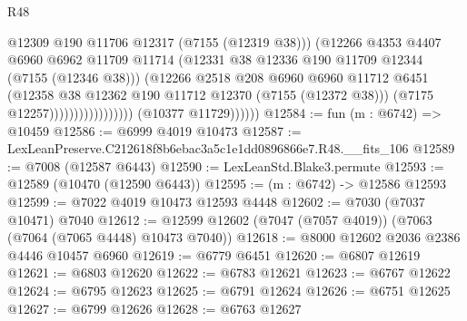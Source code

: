 \begin{lexlean}{R48}
\begin{coremodule}
                                            @12309
                                            @190
                                            @11706
                                            @12317
                                            (@7155 (@12319 @38)))
                                          (@12266
                                            @4353
                                            @4407
                                            @6960
                                            @6962
                                            @11709
                                            @11714
                                            (@12331
                                              @38
                                              @12336
                                              @190
                                              @11709
                                              @12344
                                              (@7155 (@12346 @38)))
                                            (@12266
                                              @2518
                                              @208
                                              @6960
                                              @6960
                                              @11712
                                              @6451
                                              (@12358
                                                @38
                                                @12362
                                                @190
                                                @11712
                                                @12370
                                                (@7155 (@12372 @38)))
                                              (@7175 @12257)))))))))))))))))
              (@10377 @11729))))))
@12584 := fun (m : @6742) => @10459
@12586 := @6999 @4019 @10473
@12587 := LexLeanPreserve.C212618f8b6ebac3a5c1e1dd0896866e7.R48.__fits_106
@12589 := @7008 (@12587 @6443)
@12590 := LexLeanStd.Blake3.permute
@12593 := @12589 (@10470 (@12590 @6443))
@12595 := (m : @6742) -> @12586 @12593
@12599 := @7022 @4019 @10473 @12593 @4448
@12602 := @7030 (@7037 @10471) @7040
@12612 := @12599 @12602 (@7047 (@7057 @4019)) (@7063 (@7064 (@7065 @4448) @10473 @7040))
@12618 := @8000 @12602 @2036 @2386 @4446 @10457 @6960
@12619 := @6779 @6451
@12620 := @6807 @12619
@12621 := @6803 @12620
@12622 := @6783 @12621
@12623 := @6767 @12622
@12624 := @6795 @12623
@12625 := @6791 @12624
@12626 := @6751 @12625
@12627 := @6799 @12626
@12628 := @6763 @12627

\end{coremodule}
\end{lexlean}

